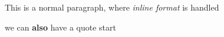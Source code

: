
This is a normal paragraph, where \emph{inline format} is handled


we can \textbf{also} have a quote start %